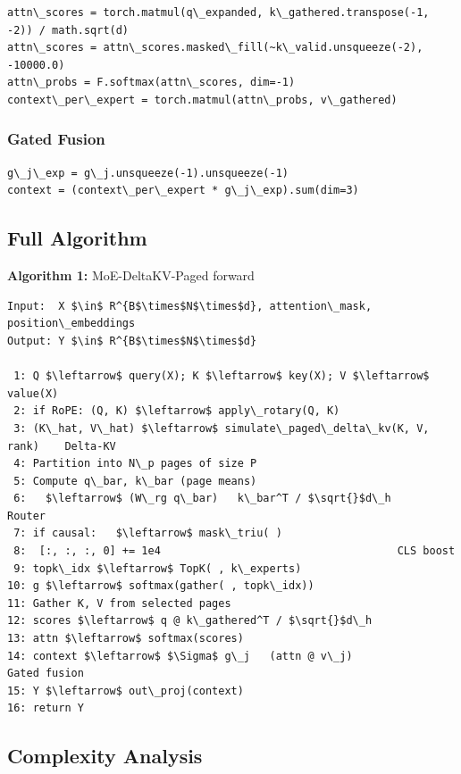 \begin{lstlisting}
attn\_scores = torch.matmul(q\_expanded, k\_gathered.transpose(-1, -2)) / math.sqrt(d)
attn\_scores = attn\_scores.masked\_fill(~k\_valid.unsqueeze(-2), -10000.0)
attn\_probs = F.softmax(attn\_scores, dim=-1)
context\_per\_expert = torch.matmul(attn\_probs, v\_gathered)
\end{lstlisting}

\subsubsection{Gated Fusion}

\begin{lstlisting}
g\_j\_exp = g\_j.unsqueeze(-1).unsqueeze(-1)
context = (context\_per\_expert * g\_j\_exp).sum(dim=3)
\end{lstlisting}

\subsection{Full Algorithm}

\textbf{Algorithm 1:} MoE-DeltaKV-Paged forward
\begin{lstlisting}
Input:  X $\in$ R^{B$\times$N$\times$d}, attention\_mask, position\_embeddings
Output: Y $\in$ R^{B$\times$N$\times$d}

 1: Q $\leftarrow$ query(X); K $\leftarrow$ key(X); V $\leftarrow$ value(X)
 2: if RoPE: (Q, K) $\leftarrow$ apply\_rotary(Q, K)
 3: (K\_hat, V\_hat) $\leftarrow$ simulate\_paged\_delta\_kv(K, V, rank)    Delta-KV
 4: Partition into N\_p pages of size P
 5: Compute q\_bar, k\_bar (page means)
 6:   $\leftarrow$ (W\_rg q\_bar)   k\_bar^T / $\sqrt{}$d\_h                      Router
 7: if causal:   $\leftarrow$ mask\_triu( )
 8:  [:, :, :, 0] += 1e4                                     CLS boost
 9: topk\_idx $\leftarrow$ TopK( , k\_experts)
10: g $\leftarrow$ softmax(gather( , topk\_idx))
11: Gather K, V from selected pages
12: scores $\leftarrow$ q @ k\_gathered^T / $\sqrt{}$d\_h
13: attn $\leftarrow$ softmax(scores)
14: context $\leftarrow$ $\Sigma$ g\_j   (attn @ v\_j)                          Gated fusion
15: Y $\leftarrow$ out\_proj(context)
16: return Y
\end{lstlisting}

\subsection{Complexity Analysis}

